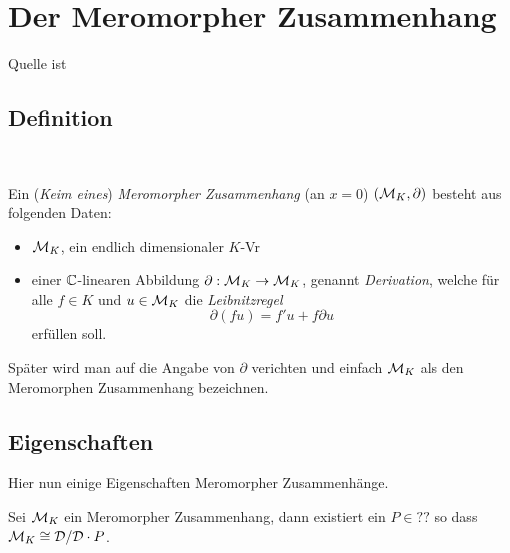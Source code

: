
\chapter{Der Meromorpher Zusammenhang}
Quelle ist \cite{sabbah_cimpa90}
\section{Definition}~

\begin{defn}
  Ein (\emph{Keim eines}) \emph{Meromorpher Zusammenhang} (an $x=0$)
  $(\mathcal{M}_K,\partial)$ besteht aus folgenden Daten:
  \begin{itemize}
    \item $\mathcal{M}_K$, ein endlich dimensionaler $K$-Vr
    \item einer $\mathbb{C}$-linearen Abbildung $\partial:\mathcal{M}_K\rightarrow \mathcal{M}_K$, genannt
      \emph{Derivation}, welche für alle $f\in K$ und $u\in \mathcal{M}_K$ die
      \emph{Leibnitzregel}
      \begin{equation}\label{eq:Leibnitzregel}
        \partial(fu)=f'u+f\partial u
      \end{equation}
      erfüllen soll.
  \end{itemize}
\end{defn}


\begin{bem}
  Später wird man auf die Angabe von $\partial$ verichten und einfach $\mathcal{M}_K$ als
  den Meromorphen Zusammenhang bezeichnen.
\end{bem}

\section{Eigenschaften}
Hier nun einige Eigenschaften Meromorpher Zusammenhänge.

\begin{lem}
  Sei $\mathcal{M}_K$ ein Meromorpher Zusammenhang, dann existiert ein $P\in??$ so dass
  $\mathcal{M}_K\cong\mathcal{D}/\mathcal{D}\cdot P$.
\end{lem}

